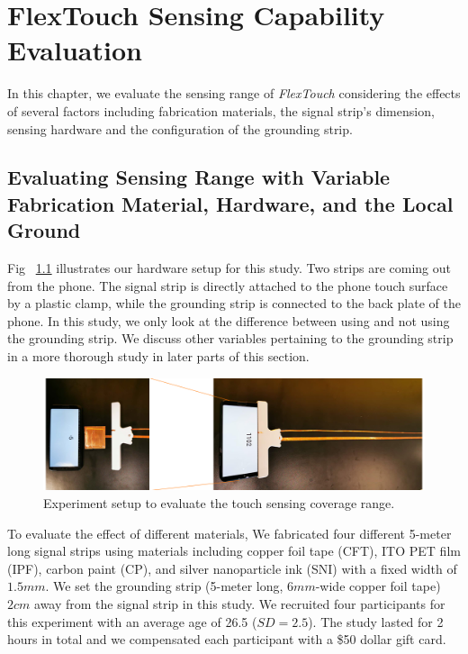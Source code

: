 \chapter{FlexTouch Sensing Capability Evaluation}
In this chapter, we evaluate the sensing range of \textit{FlexTouch} considering the effects of several factors including fabrication materials, the signal strip's dimension, sensing hardware and the configuration of the grounding strip.

\section{Evaluating Sensing Range with Variable Fabrication Material, Hardware, and the Local Ground}

Fig ~\ref{fig:experiment} illustrates our hardware setup for this study. Two strips are coming out from the phone. The signal strip is directly attached to the phone touch surface by a plastic clamp, while the grounding strip is connected to the back plate of the phone. In this study, we only look at the difference between using and not using the grounding strip. We discuss other variables pertaining to the  grounding strip in a more thorough study in later parts of this section. 

\begin{figure}[ht]
	\centering
	\includegraphics[width=0.95\columnwidth]{figures/evaluation_env.png}
	\setlength{\belowcaptionskip}{-6pt}
    \caption{Experiment setup to evaluate the touch sensing coverage range.}
    \label{fig:experiment}
\end{figure}
	
To evaluate the effect of different materials, We fabricated four different 5-meter long signal strips using materials including copper foil tape (CFT), ITO PET film (IPF), carbon paint (CP), and silver nanoparticle ink (SNI) with a fixed width of $1.5mm$. We set the grounding strip (5-meter long, $6mm$-wide copper foil tape) $2 cm$ away from the signal strip in this study. We recruited four participants for this experiment with an average age of 26.5 ($SD = 2.5$). The study lasted for 2 hours in total and we compensated each participant with a \$50 dollar gift card.


